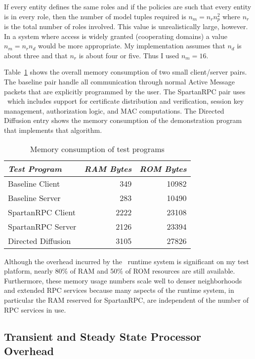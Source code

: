 If every entity defines the same roles and if the policies are such that every entity is in
every role, then the number of model tuples required is $n_m = n_r n_p^2$ where $n_r$ is the
total number of roles involved. This value is unrealistically large, however. In a system where
access is widely granted (cooperating domains) a value $n_m = n_r n_d$ would be more
appropriate. My implementation assumes that $n_d$ is about three and that $n_r$ is about four or
five. Thus I used $n_m = 16$.

Table~\ref{table-test-program-ram} shows the overall memory consumption of two small
client/server pairs. The baseline pair handle all communication through normal Active Message
packets that are explicitly programmed by the user. The SpartanRPC pair uses \Sprocket\ which
includes support for certificate distribution and verification, session key management,
authorization logic, and MAC computations. The Directed Diffusion entry shows the memory
consumption of the demonstration program that implements that algorithm.

\begin{table}[!t]
  \newcommand\T{\rule{0pt}{2.1ex}}
  \centering
  \caption{Memory consumption of test programs}
  {
  \begin{tabular}{|l|r|r|} \hline
    \textit{Test Program} \T & \textit{RAM Bytes} & \textit{ROM Bytes} \\
    \hline \hline

    Baseline Client    \T &  349 & 10982 \\ \hline 
    Baseline Server    \T &  283 & 10490 \\ \hline
    SpartanRPC Client  \T & 2222 & 23108 \\ \hline
    SpartanRPC Server  \T & 2126 & 23394 \\ \hline
    Directed Diffusion \T & 3105 & 27826 \\ \hline
  \end{tabular}
  }
  \label{table-test-program-ram}
\end{table}

Although the overhead incurred by the \Sprocket\ runtime system is significant on my test
platform, nearly 80\% of RAM and 50\% of ROM resources are still available. Furthermore, these
memory usage numbers scale well to denser neighborhoods and extended RPC services because many
aspects of the runtime system, in particular the RAM reserved for SpartanRPC, are independent of
the number of RPC services in use.

\subsection{Transient and Steady State Processor Overhead}
\label{section-sprocket-cpu-performance}

